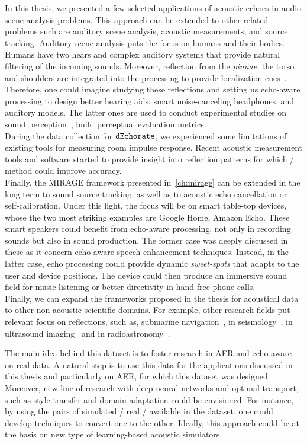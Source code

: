 In this thesis, we presented a few selected applications of acoustic echoes in audio scene analysis problems.
This approach can be extended to other related problems such are auditory scene analysis, acoustic measurements, and source tracking.
Auditory scene analysis puts the focus on humans and their bodies.
Humans have two hears and complex auditory systems that provide natural filtering of the incoming sounds.
Moreover, reflection from the \textit{pinnae}, the torso and shoulders are integrated into the processing to provide localization cues~.
Therefore, one could imagine studying these reflections and setting us echo-aware processing to design better hearing aids, smart noise-canceling headphones, and auditory models.
The latter ones are used to conduct experimental studies on sound perception~, build perceptual evaluation metrics.
\\During the data collection for $\texttt{dEchorate}$, we experienced some limitations of existing tools for measuring room impulse response.
Recent acoustic measurement tools and software started to provide insight into reflection patterns for which \AER/ method could improve accuracy.
\\Finally, the \acs{MIRAGE} framework presented in~\cref{ch:mirage} can be extended in the long term to sound source tracking, as well as to acoustic echo cancellation or self-calibration.
Under this light, the focus will be on smart table-top devices, whose the two most striking examples are Google Home, Amazon Echo.
These smart speakers could benefit from echo-aware processing, not only in recording sounds but also in sound production.
The former case was deeply discussed in these as it concern echo-aware speech enhancement techniques.
Instead, in the latter case, echo processing could provide dynamic \textit{sweet-spots} that adapts to the user and device positions.
The device could then produce an immersive sound field for music listening or better directivity in hand-free phone-calls.
\\Finally, we can expand the frameworks proposed in the thesis for acoustical data to other non-acoustic scientific domains.
For example, other research fields put relevant focus on reflections, such as,
submarine navigation~, in seismology~, in ultrasound imaging~ and in radioastronomy~.

The main idea behind this dataset is to foster research in \ac{AER} and echo-aware on real data.
A natural step is to use this data for the applications discussed in this thesis and particularly on \ac{AER}, for which this dataset was designed.
Moreover, new line of research with deep neural networks and optimal transport, such as style transfer and domain adaptation could be envisioned.
For instance, by using the pairs of simulated \vs/ real \RIRs/ available in the dataset, one could develop techniques to convert one to the other.
Ideally, this approach could be at the basis on new type of learning-based acoustic simulators.


